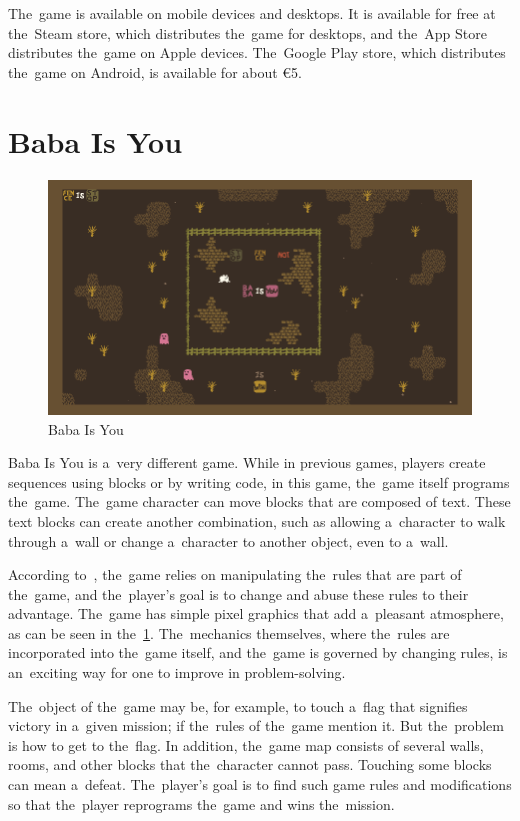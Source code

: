 The~game is available on mobile devices and desktops.
It is available for free at the~Steam store, which distributes the~game for desktops, and the~App Store distributes the~game on Apple devices.
The~Google Play store, which distributes the~game on Android, is available for about €5.

\section{Baba Is You}

\begin{figure}
    \centering
    \includegraphics[width=1\linewidth]{assets/similar-games/baba.png}
    \caption{Baba Is You~\cite{a2022_baba}}
    \label{fig:babaisyou}
\end{figure}

Baba Is You is a~very different game.
While in previous games, players create sequences using blocks or by writing code, in this game, the~game itself programs the~game.
The~game character can move blocks that are composed of text.
These text blocks can create another combination, such as allowing a~character to walk through a~wall or change a~character to another object, even to a~wall.

According to~\cite{a2022_baba}, the~game relies on manipulating the~rules that are part of the~game, and the~player's goal is to change and abuse these rules to their advantage.
The~game has simple pixel graphics that add a~pleasant atmosphere, as can be seen in the~\ref {fig:babaisyou}.
The~mechanics themselves, where the~rules are incorporated into the~game itself, and the~game is governed by changing rules, is an~exciting way for one to improve in problem-solving.

The~object of the~game may be, for example, to touch a~flag that signifies victory in a~given mission; if the~rules of the~game mention it.
But the~problem is how to get to the~flag.
In addition, the~game map consists of several walls, rooms, and other blocks that the~character cannot pass.
Touching some blocks can mean a~defeat.
The~player's goal is to find such game rules and modifications so that the~player reprograms the~game and wins the~mission.

